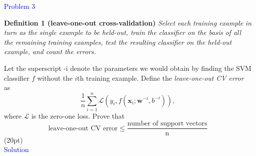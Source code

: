 \textcolor{blue}{Problem 3}
\par \textbf{Definition 1 (leave-one-out cross-validation)} \textit{Select each training example in turn as the single example to be held-out, train the classifier on the basis of all the remaining training examples, test the resulting classifier on the held-out example, and count the errors.}
\par Let the superscript -i denote the parameters we would obtain by finding the SVM classifier $f$ without the $i$th training example. Define the \textit{leave-one-out CV error} as
\begin{equation}
    \frac{1}{n}\sum_{i=1}^n\mathcal{L}(y_i,f(\mathbf{x}_i;\mathbf{w}^{-i},b^{-i})),
\end{equation}
where $\mathcal{L}$ is the zero-one loss. Prove that
\begin{equation}
    \text{leave-one-out CV error}\leq \frac{\text{number of support vectors}}{\text{n}}
\end{equation} (20pt) \\
\textcolor{blue}{Solution}

















\newpage
